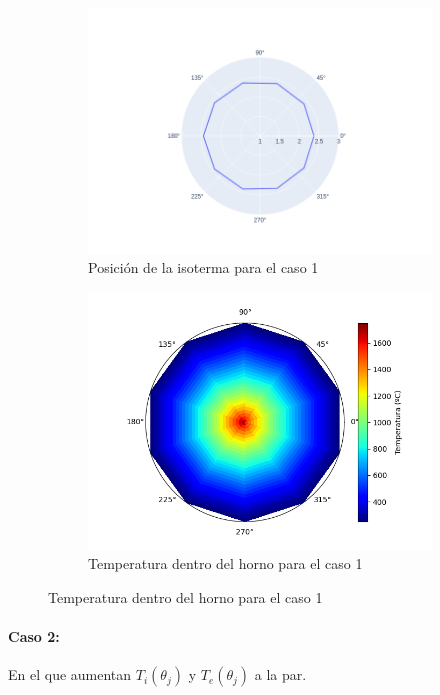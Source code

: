 \documentclass[12pt]{article}
\begin{document}
\begin{figure}[H]
\centering
\begin{subfigure}{0.5\textwidth}
  \includegraphics[scale=0.4]{uniform.0.isotherm}
  \caption{Posición de la isoterma para el caso 1}
\end{subfigure}%
\begin{subfigure}{0.5\textwidth}
  \includegraphics[scale=0.5]{uniform.0.temperature}
  \caption{Temperatura dentro del horno para el caso 1}
\end{subfigure}
\label{fig:uniform.0}
\end{figure}

\paragraph{Caso 2:} En el que aumentan \(T_i(\theta_j)\) y \(T_e(\theta_j)\) a la par.
\end{document}
